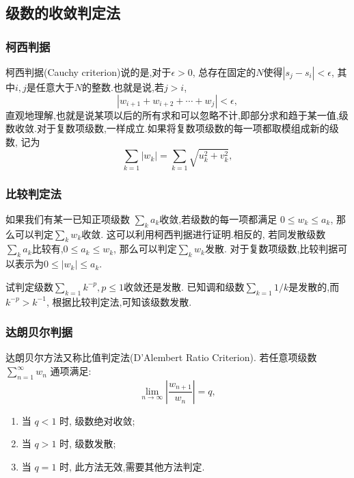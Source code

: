 \subsection{级数的收敛判定法}

\subsubsection{柯西判据}
柯西判据(Cauchy criterion)说的是,对于$\epsilon>0$, 总存在固定的$N$使得$|s_j - s_i|< \epsilon$, 其中$i,j$是任意大于$N$的整数.也就是说,若$j>i$,
\begin{equation}
    | w_{i+1} + w_{i+2} + \cdots + w_{j} | < \epsilon ,
\end{equation}
直观地理解,也就是说某项以后的所有求和可以忽略不计,即部分求和趋于某一值,级数收敛.对于复数项级数,一样成立.如果将复数项级数的每一项都取模组成新的级数,
记为
\begin{equation}
    \sum_{k=1} |w_k| = \sum_{k=1}\sqrt { u_k^2 + v_k^2},
\end{equation}

\subsubsection{比较判定法}
如果我们有某一已知正项级数 $\sum_k a_k$收敛,若级数的每一项都满足 $0 \leq w_k \leq a_k$, 那么可以判定$\sum_k w_k$收敛.
这可以利用柯西判据进行证明.相反的, 若同发散级数$\sum_{k} a_k$比较有,$0 \leq a_k  \leq w_k$, 那么可以判定$\sum_k w_k$发散.
对于复数项级数,比较判据可以表示为$0 \leq |w_k| \leq a_k$.

\begin{examplebox}{试判定级数$\sum_{k=1} k^{-p}, p\leq 1$收敛还是发散.}
    已知调和级数$\sum_{k=1}1/k$是发散的,而 $k^{-p} > k^{-1}$, 根据比较判定法,可知该级数发散.
\end{examplebox}

\subsubsection{达朗贝尔判据}
达朗贝尔方法又称比值判定法(D'Alembert Ratio Criterion).
若任意项级数 $\sum_{n=1}^{\infty} w_n$ 通项满足:
$$
\lim _{n \to \infty}\left|\frac{w_{n+1}}{w_n}\right|=q ,
$$
\begin{enumerate}
    \item 当 $q<1$ 时, 级数绝对收敛;
    \item 当 $q>1$ 时, 级数发散;
    \item 当 $q=1$ 时, 此方法无效,需要其他方法判定.
\end{enumerate}

